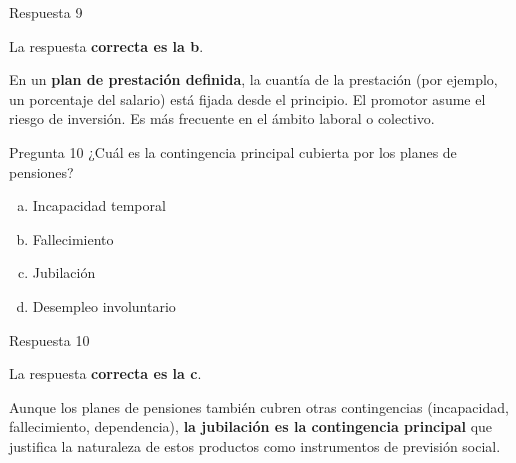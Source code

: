 \documentclass[
  ignorenonframetext,
  aspectratio=54,
  spanish,
]{beamer}
\providecommand{\tightlist}{%
  \setlength{\itemsep}{0pt}\setlength{\parskip}{0pt}}
\begin{document}
\begin{frame}{Respuesta 9}
\label{respuesta-9}
\begin{tcolorbox}[enhanced jigsaw, rightrule=.15mm, colback=white, arc=.35mm, colframe=quarto-callout-tip-color-frame, leftrule=.75mm, bottomrule=.15mm, left=2mm, toprule=.15mm, opacityback=0, breakable]
\begin{minipage}[t]{5.5mm}
\textcolor{quarto-callout-tip-color}{\faLightbulb}
\end{minipage}%
\begin{minipage}[t]{\textwidth - 5.5mm}

La respuesta \textbf{correcta es la b}.

En un \textbf{plan de prestación definida}, la cuantía de la prestación
(por ejemplo, un porcentaje del salario) está fijada desde el principio.
El promotor asume el riesgo de inversión. Es más frecuente en el ámbito
laboral o colectivo.

\end{minipage}%
\end{tcolorbox}
\end{frame}

\begin{frame}{Pregunta 10}
\label{pregunta-10}
¿Cuál es la contingencia principal cubierta por los planes de pensiones?

\begin{enumerate}
[a.]
\tightlist
\item
  Incapacidad temporal
\item
  Fallecimiento
\item
  Jubilación
\item
  Desempleo involuntario
\end{enumerate}
\end{frame}

\begin{frame}{Respuesta 10}
\label{respuesta-10}
\begin{tcolorbox}[enhanced jigsaw, rightrule=.15mm, colback=white, arc=.35mm, colframe=quarto-callout-tip-color-frame, leftrule=.75mm, bottomrule=.15mm, left=2mm, toprule=.15mm, opacityback=0, breakable]
\begin{minipage}[t]{5.5mm}
\textcolor{quarto-callout-tip-color}{\faLightbulb}
\end{minipage}%
\begin{minipage}[t]{\textwidth - 5.5mm}

La respuesta \textbf{correcta es la c}.

Aunque los planes de pensiones también cubren otras contingencias
(incapacidad, fallecimiento, dependencia), \textbf{la jubilación es la
contingencia principal} que justifica la naturaleza de estos productos
como instrumentos de previsión social.

\end{minipage}%
\end{tcolorbox}
\end{frame}
\end{document}
